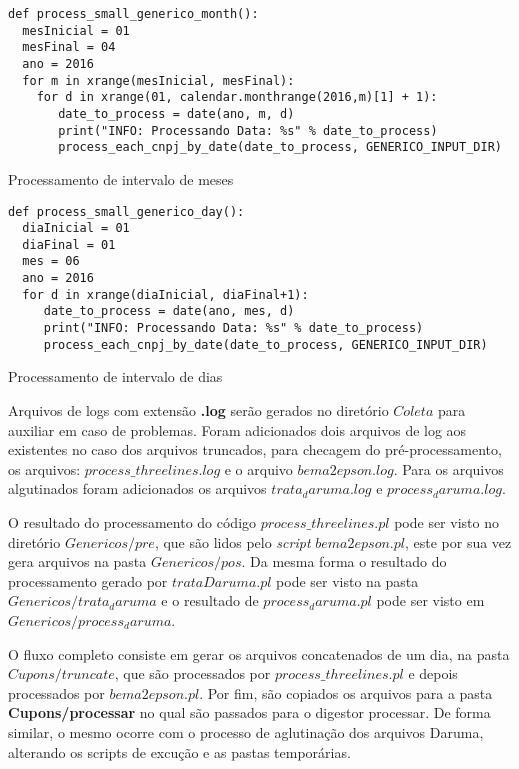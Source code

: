 \documentclass{article}      %
\begin{document}
\begin{listing}[H]
\begin{verbatim}
def process_small_generico_month():
  mesInicial = 01
  mesFinal = 04
  ano = 2016
  for m in xrange(mesInicial, mesFinal):
    for d in xrange(01, calendar.monthrange(2016,m)[1] + 1):
       date_to_process = date(ano, m, d)
       print("INFO: Processando Data: %s" % date_to_process)
       process_each_cnpj_by_date(date_to_process, GENERICO_INPUT_DIR)
\end{verbatim}
\caption{Processamento de intervalo de meses}
\label{code:meses}
\end{listing}


\begin{listing}[H]
\begin{verbatim}
def process_small_generico_day():
  diaInicial = 01
  diaFinal = 01
  mes = 06
  ano = 2016
  for d in xrange(diaInicial, diaFinal+1):
     date_to_process = date(ano, mes, d)
     print("INFO: Processando Data: %s" % date_to_process)
     process_each_cnpj_by_date(date_to_process, GENERICO_INPUT_DIR)
\end{verbatim}
\caption{Processamento de intervalo de dias}
\label{code:dias}
\end{listing}


Arquivos de logs com extensão \textbf{.log} serão gerados no diretório $Coleta$ para auxiliar em caso de problemas. Foram adicionados dois arquivos de log aos existentes no caso dos arquivos truncados, para checagem do pré-processamento, os arquivos: $process\_threelines.log$ e o arquivo $bema2epson.log$. Para os arquivos algutinados foram adicionados os arquivos $trata_daruma.log$ e $process_daruma.log$. 

O resultado do processamento do código $process\_threelines.pl$ pode ser visto no diretório $Genericos/pre$, que são lidos pelo \emph{script} $bema2epson.pl$, este por sua vez gera arquivos na pasta $Genericos/pos$. Da mesma forma o resultado do processamento gerado por $trataDaruma.pl$ pode ser visto na pasta $Genericos/trata_daruma$ e o resultado de $process_daruma.pl$ pode ser visto em $Genericos/process_daruma$.

O fluxo completo consiste em gerar os arquivos concatenados de um dia, na pasta $Cupons/truncate$, que são processados por $process\_threelines.pl$ e depois processados por $bema2epson.pl$. Por fim, são copiados os arquivos para a pasta \textbf{Cupons/processar} no qual são passados para o digestor processar. De forma similar, o mesmo ocorre com o processo de aglutinação dos arquivos Daruma, alterando os scripts de excução e as pastas temporárias.
\end{document}
